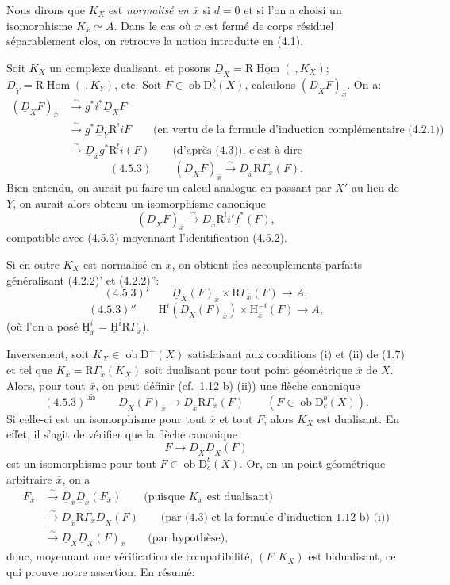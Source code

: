 \documentclass[11pt]{article}
\providecommand{\uH}{\underline{\mathrm H}}
\DeclareMathOperator{\Hom}{Hom}
\newcommand{\R}{\mathrm{R}}\newcommand{\RHomCore}{\mathrm{RHom}}
\newcommand{\D}{\mathrm{D}}
\newcommand{\ob}{\operatorname{ob}}
\newcommand{\ol}[1]{\overline{#1}}
\providecommand{\Hom}{\operatorname{Hom}}
\providecommand{\ob}{\operatorname{ob}}
\providecommand{\R}{\mathrm R}
\providecommand{\Hom}{\operatorname{Hom}}
\begin{document}
Nous dirons que $K_X$ est \emph{normalisé en $\ol{x}$} si $d=0$ et si l'on a choisi un isomorphisme $K_{\ol{x}}\simeq A$. Dans le cas où $x$ est fermé de corps résiduel séparablement clos, on retrouve la notion introduite en (4.1).

Soit $K_X$ un complexe dualisant, et posons $\underline{D}_X=\R\underline{\Hom}(\ ,K_X)$; $\underline{D}_Y=\R\underline{\Hom}(\ ,K_Y)$, etc. Soit $F\in\ob\D_c^b(X)$, calculons $(\underline{D}_XF)_{\ol{x}}$. On a:
\[
\begin{aligned}
(\underline{D}_XF)_{\ol{x}}&\xrightarrow{\sim}g^*i^*\underline{D}_X F\\
&\xrightarrow{\sim}g^*\underline{D}_Y\R^{!}iF\qquad\text{(en vertu de la formule d'induction complémentaire (4.2.1))}\\
&\xrightarrow{\sim}\underline{D}_{\ol{x}}g^*\R^{!}i(F)\qquad\text{(d'après (4.3)), c'est-à-dire}
\end{aligned}
\]
\[
(4.5.3)\qquad (\underline{D}_X F)_{\ol{x}}\xrightarrow{\sim}\underline{D}_{\ol{x}}\R\Gamma_{\ol{x}}(F).
\]
Bien entendu, on aurait pu faire un calcul analogue en passant par $X'$ au lieu de $Y$, on aurait alors obtenu un isomorphisme canonique
\[
(\underline{D}_XF)_{\ol{x}}\xrightarrow{\sim}\underline{D}_{\ol{x}}\R^{!}i'f^*(F),
\]
compatible avec (4.5.3) moyennant l'identification (4.5.2).

Si en outre $K_X$ est normalisé en $\ol{x}$, on obtient des accouplements parfaits généralisant (4.2.2)' et (4.2.2)'':
\[
(4.5.3)'\qquad \underline{D}_X(F)_{\ol{x}}\times \R\Gamma_{\ol{x}}(F)\longrightarrow A,
\]
\[
(4.5.3)''\qquad \uH^i(\underline{D}_X(F)_{\ol{x}})\times \uH_{\ol{x}}^{-i}(F)\longrightarrow A,
\]
(où l'on a posé $\uH_{\ol{x}}^i=\uH^i\R\Gamma_{\ol{x}}$).

Inversement, soit $K_X\in\ob\D^+(X)$ satisfaisant aux conditions (i) et (ii) de (1.7) et tel que $K_{\ol{x}}=\R\Gamma_{\ol{x}}(K_X)$ soit dualisant pour tout point géométrique $\ol{x}$ de $X$. Alors, pour tout $\ol{x}$, on peut définir (cf.~1.12 b) (ii)) une flèche canonique
\[
(4.5.3)^{\mathrm{bis}}\qquad \underline{D}_X(F)_{\ol{x}}\longrightarrow \underline{D}_{\ol{x}}\R\Gamma_{\ol{x}}(F)\qquad (F\in\ob\D_c^b(X)).
\]
Si celle-ci est un isomorphisme pour tout $\ol{x}$ et tout $F$, alors $K_X$ est dualisant. En effet, il s'agit de vérifier que la flèche canonique
\[
F\longrightarrow \underline{D}_X\underline{D}_X(F)
\]
est un isomorphisme pour tout $F\in\ob\D_c^b(X)$. Or, en un point géométrique arbitraire $\ol{x}$, on a
\[
\begin{aligned}
F_{\ol{x}}&\xrightarrow{\sim}\underline{D}_{\ol{x}}\underline{D}_{\ol{x}}(F_{\ol{x}})\qquad\text{(puisque $K_{\ol{x}}$ est dualisant)}\\
&\xrightarrow{\sim}\underline{D}_{\ol{x}}\R\Gamma_{\ol{x}}\underline{D}_X(F)\qquad\text{(par (4.3) et la formule d'induction 1.12 b) (i))}\\
&\xrightarrow{\sim}\underline{D}_X\underline{D}_X(F)_{\ol{x}}\qquad\text{(par hypothèse)},
\end{aligned}
\]
donc, moyennant une vérification de compatibilité, $(F,K_X)$ est bidualisant, ce qui prouve notre assertion. En résumé:
\end{document}
